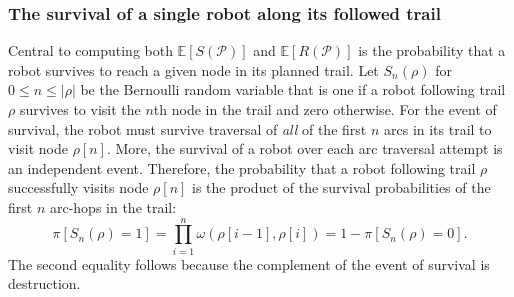 \documentclass[fleqn,10pt,lineno]{wlpeerj}
\begin{document}
\subsubsection{The survival of a single robot along its followed trail}
Central to computing both $\mathbb{E}[S(\mathcal{P})]$ and $\mathbb{E}[R(\mathcal{P})]$ is the probability that a robot survives to reach a given node in its planned trail.
Let $S_n(\rho)$ for $0 \leq n \leq \lvert \rho \rvert$ be the Bernoulli random variable that is one if a robot following trail $\rho$ survives to visit the $n$th node in the trail and zero otherwise. 
For the event of survival, the robot must survive traversal of \emph{all} of the first $n$ arcs in its trail to visit node $\rho[n]$. More, the survival of a robot over each arc traversal attempt is an independent event. Therefore, the probability that a robot following trail $\rho$ successfully visits node $\rho[n]$ is the product of the survival probabilities of the first $n$ arc-hops in the trail:
\begin{equation}
	\pi[S_n(\rho) = 1] = \prod_{i=1}^n \omega(\rho[i-1], \rho[i]) 
	= 1 - \pi[S_n(\rho) = 0]. \label{eq:pi_S_n}
\end{equation} %
The second equality follows because the complement of the event of survival is destruction.
\end{document}

